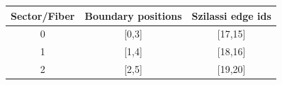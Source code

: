 \begin{center}\small
\begin{tabular}{c|c|c}
\toprule
Sector/Fiber & Boundary positions & Szilassi edge ids\\
\midrule
0 & [0,3] & [17,15]\\
1 & [1,4] & [18,16]\\
2 & [2,5] & [19,20]\\
\bottomrule
\end{tabular}
\end{center}
